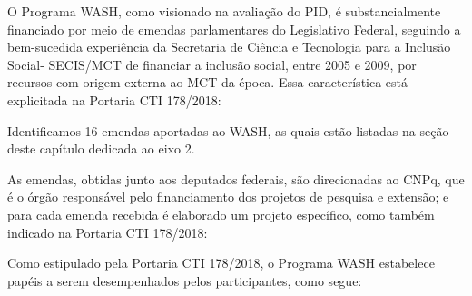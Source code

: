 O Programa WASH, como visionado na avaliação do PID, é substancialmente financiado por meio de emendas parlamentares do Legislativo Federal, seguindo a bem-sucedida experiência da Secretaria de Ciência e Tecnologia para a Inclusão Social- SECIS/MCT de financiar a inclusão social, entre 2005 e 2009, por recursos com origem externa ao MCT da época. Essa característica está explicitada na Portaria CTI 178/2018:


\noindent\begin{center}\mbox{\centering{}}\end{center}


Identificamos 16 emendas aportadas ao WASH, as quais estão listadas na seção deste capítulo dedicada ao eixo 2.

As emendas, obtidas junto aos deputados federais, são direcionadas ao CNPq, que é o órgão responsável pelo financiamento dos projetos de pesquisa e extensão; e para cada emenda recebida é elaborado um projeto específico, como também indicado na Portaria CTI 178/2018:


\noindent\begin{center}\mbox{\centering{}}\end{center}


Como estipulado pela Portaria CTI 178/2018, o Programa WASH estabelece papéis a serem desempenhados pelos participantes, como segue:


